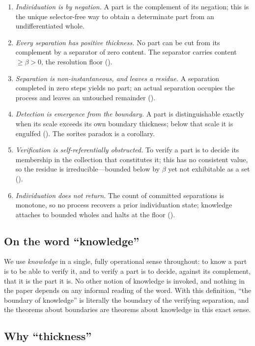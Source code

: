 \documentclass[11pt,a4paper]{article}
\theoremstyle{thmstyle}
\theoremstyle{definition}
\theoremstyle{remark}
\newcommand{\thick}{\beta}
\begin{document}
\begin{enumerate}[label=(\roman*),leftmargin=2.2em]
\item \emph{Individuation is by negation.} A part is the complement of its
negation; this is the unique selector-free way to obtain a determinate part
from an undifferentiated whole.
\item \emph{Every separation has positive thickness.} No part can be cut from
its complement by a separator of zero content. The separator carries content
$\ge\thick>0$, the resolution floor ().
\item \emph{Separation is non-instantaneous, and leaves a residue.} A
separation completed in zero steps yields no part; an actual separation
occupies the process and leaves an untouched remainder
().
\item \emph{Detection is emergence from the boundary.} A part is
distinguishable exactly when its scale exceeds its own boundary thickness;
below that scale it is engulfed (). The sorites paradox is a
corollary.
\item \emph{Verification is self-referentially obstructed.} To verify a part
is to decide its membership in the collection that constitutes it; this has no
consistent value, so the residue is irreducible---bounded below by $\thick$
yet not exhibitable as a set ().
\item \emph{Individuation does not return.} The count of committed separations
is monotone, so no process recovers a prior individuation state; knowledge
attaches to bounded wholes and halts at the floor ().
\end{enumerate}

\subsection{On the word ``knowledge''}

We use \emph{knowledge} in a single, fully operational sense throughout: to
know a part is to be able to verify it, and to verify a part is to decide,
against its complement, that it is the part it is. No other notion of
knowledge is invoked, and nothing in the paper depends on any informal
reading of the word. With this definition, ``the boundary of knowledge'' is
literally the boundary of the verifying separation, and the theorems about
boundaries are theorems about knowledge in this exact sense.

\subsection{Why ``thickness''}
\end{document}
